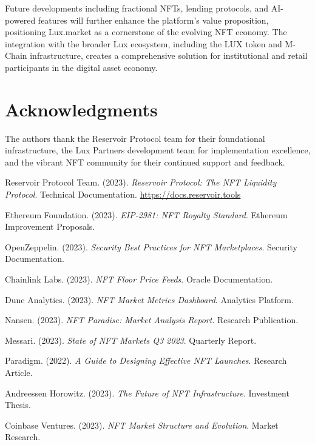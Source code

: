 \documentclass[11pt,a4paper]{article}
\begin{document}
Future developments including fractional NFTs, lending protocols, and AI-powered features will further enhance the platform's value proposition, positioning Lux.market as a cornerstone of the evolving NFT economy. The integration with the broader Lux ecosystem, including the LUX token and M-Chain infrastructure, creates a comprehensive solution for institutional and retail participants in the digital asset economy.

\section*{Acknowledgments}

The authors thank the Reservoir Protocol team for their foundational infrastructure, the Lux Partners development team for implementation excellence, and the vibrant NFT community for their continued support and feedback.

\begin{thebibliography}{99}

Reservoir Protocol Team. (2023). \textit{Reservoir Protocol: The NFT Liquidity Protocol}. Technical Documentation. \url{https://docs.reservoir.tools}

Ethereum Foundation. (2023). \textit{EIP-2981: NFT Royalty Standard}. Ethereum Improvement Proposals.

OpenZeppelin. (2023). \textit{Security Best Practices for NFT Marketplaces}. Security Documentation.

Chainlink Labs. (2023). \textit{NFT Floor Price Feeds}. Oracle Documentation.

Dune Analytics. (2023). \textit{NFT Market Metrics Dashboard}. Analytics Platform.

Nansen. (2023). \textit{NFT Paradise: Market Analysis Report}. Research Publication.

Messari. (2023). \textit{State of NFT Markets Q3 2023}. Quarterly Report.

Paradigm. (2022). \textit{A Guide to Designing Effective NFT Launches}. Research Article.

Andreessen Horowitz. (2023). \textit{The Future of NFT Infrastructure}. Investment Thesis.

Coinbase Ventures. (2023). \textit{NFT Market Structure and Evolution}. Market Research.

\end{thebibliography}
\end{document}
